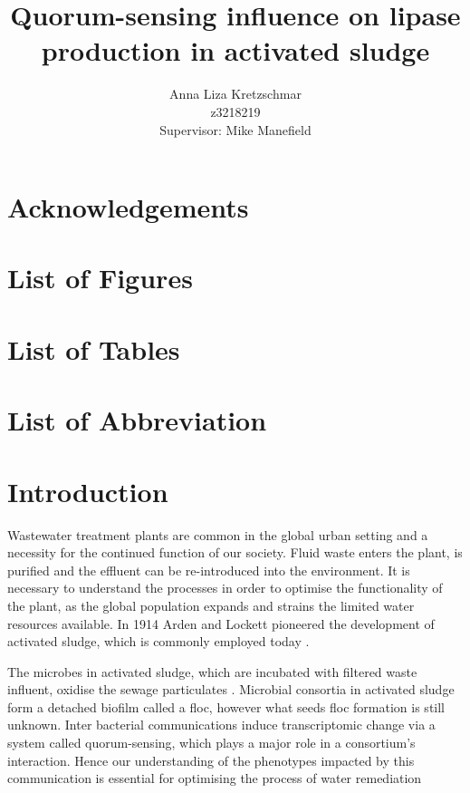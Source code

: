 \documentclass{article}
\title{\textbf{Quorum-sensing influence on lipase production in activated sludge}}
\author{Anna Liza Kretzschmar\\
        z3218219\\
        Supervisor: Mike Manefield}
\date{}
\begin{document}
\maketitle

\tableofcontents

\newpage


\section{Acknowledgements}

\newpage
\section{List of Figures}

\listoffigures

\newpage

\section{List of Tables}

\listoftables

\newpage
\section{List of Abbreviation}

%

\newpage
\section{Introduction}
Wastewater treatment plants are common in the global urban setting and a necessity for the continued function of our society. Fluid waste enters the plant, is purified and the effluent can be re-introduced into the environment. It is necessary to understand the processes in order to optimise the functionality of the plant, as the global population expands and strains the limited water resources available. In 1914 Arden and Lockett pioneered the development of activated sludge, which is commonly employed today \cite{ardern1914experiments}.


The microbes in activated sludge, which are incubated with filtered waste influent, oxidise the sewage particulates \cite{Price_95}. Microbial consortia in activated sludge form a detached biofilm called a floc, however what seeds floc formation is still unknown. Inter bacterial communications induce transcriptomic change via a system called quorum-sensing, which plays a major role in a consortium's interaction\cite{parsek2005sociomicrobiology}. Hence our understanding of the phenotypes impacted by this communication is essential for optimising the process of water remediation \cite{singh2006biofilms}
\end{document}

